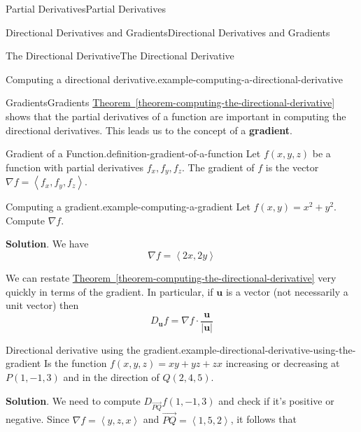 \documentclass[10pt,]{book}
\newcommand{\terminology}[1]{\textbf{#1}}
\numberwithin{equation}{section}
\newcommand{\vv}[1]{\mathbf{#1}}
\newcommand{\grad}{\nabla}
\newcommand{\dotprod}[1]{\left\langle #1 \right\rangle}
\begin{document}
\begin{chapterptx}{Partial Derivatives}{}{Partial Derivatives}{}{}
\begin{sectionptx}{Directional Derivatives and Gradients}{}{Directional Derivatives and Gradients}{}{}
\begin{subsectionptx}{The Directional Derivative}{}{The Directional Derivative}{}{}
\begin{example}{Computing a directional derivative.}{example-computing-a-directional-derivative}
%
\end{example}
\end{subsectionptx}
%
%
\typeout{************************************************}
\typeout{************************************************}
%
\begin{subsectionptx}{Gradients}{}{Gradients}{}{}\label{subsection-gradients}
\hypertarget{p-1187}{}%
\hyperref[theorem-computing-the-directional-derivative]{Theorem~\ref{theorem-computing-the-directional-derivative}} shows that the partial derivatives of a function are important in computing the directional derivatives. This leads us to the concept of a \terminology{gradient}.%
\begin{definition}{Gradient of a Function.}{definition-gradient-of-a-function}%
\hypertarget{p-1188}{}%
Let \(f(x,y,z)\) be a function with partial derivatives \(f_{x}, f_{y}, f_{z}\). The gradient of \(f\) is the vector \(\grad f = \dotprod{f_{x}, f_{y}, f_{z}}\).%
\end{definition}
\begin{example}{Computing a gradient.}{example-computing-a-gradient}%
\hypertarget{p-1189}{}%
Let \(f(x,y) = x^{2} + y^{2}\). Compute \(\grad f\).%
\par\smallskip%
\noindent\textbf{Solution}.\hypertarget{solution-186}{}\quad%
\hypertarget{p-1190}{}%
We have%
\begin{equation*}
\grad f = \dotprod{2x, 2y}
\end{equation*}
%
\end{example}
\hypertarget{p-1191}{}%
We can restate \hyperref[theorem-computing-the-directional-derivative]{Theorem~\ref{theorem-computing-the-directional-derivative}} very quickly in terms of the gradient. In particular, if \(\vv{u}\) is a vector (not necessarily a unit vector) then%
\begin{equation}
D_{\vv{u}}f = \grad f\cdot \frac{\vv{u}}{|\vv{u}|}\label{equation-directional-derivative-gradient}
\end{equation}
%
\begin{example}{Directional derivative using the gradient.}{example-directional-derivative-using-the-gradient}%
\hypertarget{p-1192}{}%
Is the function \(f(x,y,z) = xy + yz + zx\) increasing or decreasing at \(P(1,-1,3)\) and in the direction of \(Q(2,4,5)\).%
\par\smallskip%
\noindent\textbf{Solution}.\hypertarget{solution-187}{}\quad%
\hypertarget{p-1193}{}%
We need to compute \(D_{\vec{PQ}}f(1,-1,3)\) and check if it's positive or negative. Since \(\grad f = \dotprod{y, z, x}\) and \(\vec{PQ} = \dotprod{1,5,2}\), it follows that%

\end{example}
\end{subsectionptx}
\end{sectionptx}
\end{chapterptx}
\end{document}
